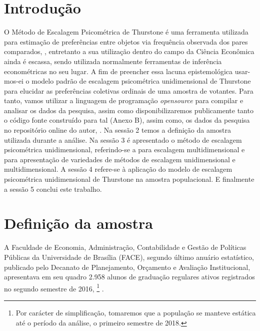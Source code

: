 \documentclass[
	article,			%
	12pt,				%
	oneside,			%
	a4paper,			%
	english,			%
	brazil,				%
	]{abntex2}
\begin{document}

\textual

\section{Introdução}


O Método de Escalagem Psicométrica de Thurstone é uma ferramenta utilizada para estimação de preferências entre objetos via frequência observada dos pares comparados, , entretanto a sua utilização dentro do campo da Ciência Econômica ainda é escassa, sendo utilizada normalmente ferramentas de inferência econométricas no seu lugar. A fim de preencher essa lacuna epistemológica usar-mos-ei o modelo padrão de escalagem psicométrica unidimensional de Thurstone para elucidar as preferências coletivas ordinais de uma amostra de votantes. Para tanto, vamos utilizar a linguagem de programação \textit{opensource}  para compilar e analisar os dados da pesquisa, assim como disponibilizaremos publicamente tanto o código fonte construído para tal (Anexo B), assim como, os dados da pesquisa no repositório online do autor, . Na sessão 2 temos a definição da amostra utilizada durante a análise. Na sessão 3 é apresentado o método de escalagem psicométrica unidimensional, referindo-se a  para escalagem multidimensional e  para apresentação de variedades de métodos de escalagem unidimensional e multidimensional. A sessão 4 refere-se à aplicação do modelo de escalagem psicométrica unidimensional de Thurstone na amostra populacional. E finalmente a sessão 5 conclui este trabalho. 



\section{Definição da amostra}


A Faculdade de Economia, Administração, Contabilidade e Gestão de Políticas Públicas da Universidade de Brasília (FACE), segundo último anuário estatístico, publicado pelo Decanato de Planejamento, Orçamento e Avaliação Institucional, apresentava em seu quadro 2.958 alunos de graduação regulares ativos registrados no segundo semestre de 2016, \footnote{Por carácter de simplificação, tomaremos que a população se manteve estática até o período da análise, o primeiro semestre de 2018.} .
\end{document}
